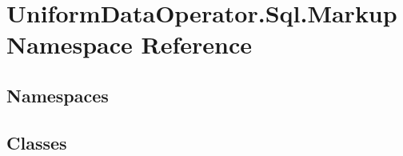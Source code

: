 \hypertarget{namespace_uniform_data_operator_1_1_sql_1_1_markup}{}\section{Uniform\+Data\+Operator.\+Sql.\+Markup Namespace Reference}
\label{namespace_uniform_data_operator_1_1_sql_1_1_markup}
\subsection*{Namespaces}
\begin{DoxyCompactItemize}
\end{DoxyCompactItemize}
\subsection*{Classes}
